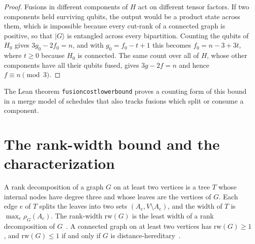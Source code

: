 \documentclass[aps,pra,onecolumn,superscriptaddress,nofootinbib,longbibliography]{revtex4-2}
\theoremstyle{plain}
\theoremstyle{remark}
\newcommand{\rw}{\mathrm{rw}}
\newcommand{\codeus}{\textunderscore\allowbreak}
\newcommand{\code}[1]{\texttt{\let\_\codeus #1}}
\begin{document}
\begin{proof}
Fusions in different components of $H$ act on different tensor factors. If two components held surviving
qubits, the output would be a product state across them, which is impossible because every cut-rank of a
connected graph is positive, so that $|G\rangle$ is entangled across every bipartition. Counting the qubits
of $H_0$ gives $3g_0-2f_0=n$, and with $g_0=f_0-t+1$ this becomes $f_0=n-3+3t$, where $t\ge 0$ because $H_0$
is connected. The same count over all of $H$, whose other components have all their qubits fused, gives
$3g-2f=n$ and hence $f\equiv n\pmod 3$.
\end{proof}

The Lean theorem \code{fusion\_cost\_lower\_bound} proves a counting form of this bound in a merge model of
schedules that also tracks fusions which split or consume a component.

\section{The rank-width bound and the characterization}\label{sec:main}

A rank decomposition of a graph $G$ on at least two vertices is a tree $T$ whose internal nodes have degree
three and whose leaves are the vertices of $G$. Each edge $e$ of $T$ splits the leaves into two sets
$(A_e,V\setminus A_e)$, and the width of $T$ is $\max_e\rho_G(A_e)$. The rank-width $\rw(G)$ is the least
width of a rank decomposition of $G$~\cite{Oum2005rank,Oum2017rank}. A connected graph on at least two
vertices has $\rw(G)\ge 1$, and $\rw(G)\le 1$ if and only if $G$ is distance-hereditary~\cite{Oum2005rank}.
\end{document}
